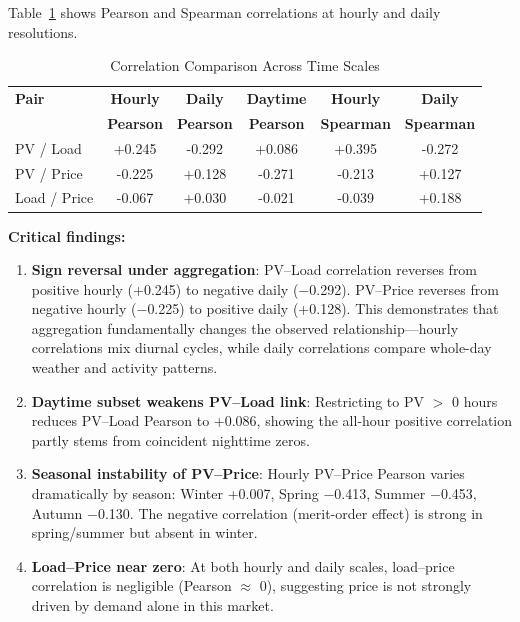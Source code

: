 \documentclass[conference]{IEEEtran}
\begin{document}
Table~\ref{tab:correlation_comparison} shows Pearson and Spearman correlations at hourly and daily resolutions.

\begin{table}[htbp]
\caption{Correlation Comparison Across Time Scales}
\label{tab:correlation_comparison}
\begin{center}
\begin{tabular}{lccccc}
\toprule
\textbf{Pair} & \textbf{Hourly} & \textbf{Daily} & \textbf{Daytime} & \textbf{Hourly} & \textbf{Daily} \\
& \textbf{Pearson} & \textbf{Pearson} & \textbf{Pearson} & \textbf{Spearman} & \textbf{Spearman} \\
\midrule
PV / Load & +0.245 & -0.292 & +0.086 & +0.395 & -0.272 \\
PV / Price & -0.225 & +0.128 & -0.271 & -0.213 & +0.127 \\
Load / Price & -0.067 & +0.030 & -0.021 & -0.039 & +0.188 \\
\bottomrule
\end{tabular}
\end{center}
\end{table}

\textbf{Critical findings:}
\begin{enumerate}
    \item \textbf{Sign reversal under aggregation}: PV–Load correlation reverses from positive hourly (+0.245) to negative daily ($-$0.292). PV–Price reverses from negative hourly ($-$0.225) to positive daily (+0.128). This demonstrates that aggregation fundamentally changes the observed relationship—hourly correlations mix diurnal cycles, while daily correlations compare whole-day weather and activity patterns.
    \item \textbf{Daytime subset weakens PV–Load link}: Restricting to PV $>$ 0 hours reduces PV–Load Pearson to +0.086, showing the all-hour positive correlation partly stems from coincident nighttime zeros.
    \item \textbf{Seasonal instability of PV–Price}: Hourly PV–Price Pearson varies dramatically by season: Winter +0.007, Spring $-$0.413, Summer $-$0.453, Autumn $-$0.130. The negative correlation (merit-order effect) is strong in spring/summer but absent in winter.
    \item \textbf{Load–Price near zero}: At both hourly and daily scales, load–price correlation is negligible (Pearson $\approx$ 0), suggesting price is not strongly driven by demand alone in this market.
\end{enumerate}
\end{document}
